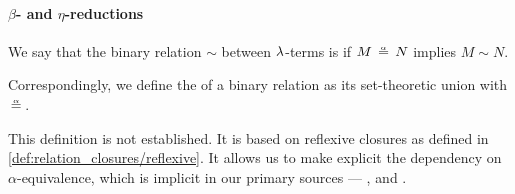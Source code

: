 \paragraph{\( \beta \)- and \( \eta \)-reductions}

\begin{definition}\label{def:alpha_reflexive}\mimprovised
  We say that the binary relation \( {\sim} \) between \( {\mathrm \lambda} \)-terms is  if \( M \aequiv N \) implies \( M \sim N \).

  Correspondingly, we define the  of a binary relation as its set-theoretic union with \( {\aequiv} \).
\end{definition}
\begin{comments}
  \item This definition is not established. It is based on reflexive closures as defined in \cref{def:relation_closures/reflexive}. It allows us to make explicit the dependency on \( \alpha \)-equivalence, which is implicit in our primary sources --- \cite[ch. 3]{Barendregt1984LambdaCalculus}, \cite[def. 1B2]{Hindley1997BasicSTT} and \cite[191]{Герасимов2011Вычислимость}.
\end{comments}

